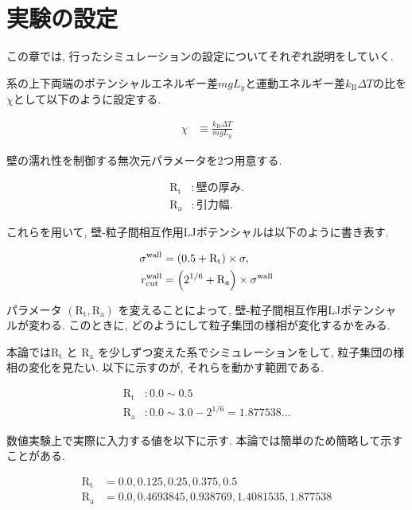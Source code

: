 \chapter{実験の設定}\label{sec:simulation}

この章では, 行ったシミュレーションの設定についてそれぞれ説明をしていく.

系の上下両端のポテンシャルエネルギー差$mgL_y$と運動エネルギー差$k_{\text{B}}\Delta T$の比を$\chi$として以下のように設定する.

\begin{align}
  \chi &\equiv \frac{k_{\text{B}}\Delta T}{mgL_{y}}
\end{align}

壁の濡れ性を制御する無次元パラメータを2つ用意する.

\begin{align}
  \text{R}_\text{t} &: 壁の厚み. \\
  \text{R}_\text{a} &: 引力幅.
\end{align}

これらを用いて, 壁-粒子間相互作用LJポテンシャルは以下のように書き表す.

\begin{align}
  \sigma^{\text{wall}} &= \qty(0.5 + \text{R}_\text{t}) \times \sigma , \\
  r^{\text{wall}}_{\text{cut}} &= \qty(2^{1/6} + \text{R}_\text{a}) \times \sigma^{\text{wall}} 
\end{align}

パラメータ $(\text{R}_\text{t}, \text{R}_\text{a})$ を変えることによって, 壁-粒子間相互作用LJポテンシャルが変わる. このときに, どのようにして粒子集団の様相が変化するかをみる.

本論では$\text{R}_\text{t}$ と $\text{R}_\text{a}$ を少しずつ変えた系でシミュレーションをして, 粒子集団の様相の変化を見たい. 以下に示すのが, それらを動かす範囲である.

\begin{align}
  \text{R}_\text{t} &\colon 0.0 \sim 0.5 \\
  \text{R}_\text{a} &\colon 0.0 \sim 3.0 - 2^{1/6} = 1.877538\dots
\end{align}

数値実験上で実際に入力する値を以下に示す. 本論では簡単のため簡略して示すことがある.

\begin{align}
  \text{R}_\text{t} &= 0.0, 0.125, 0.25, 0.375, 0.5 \\
  \text{R}_\text{a} &= 0.0, 0.4693845, 0.938769, 1.4081535, 1.877538
\end{align}


